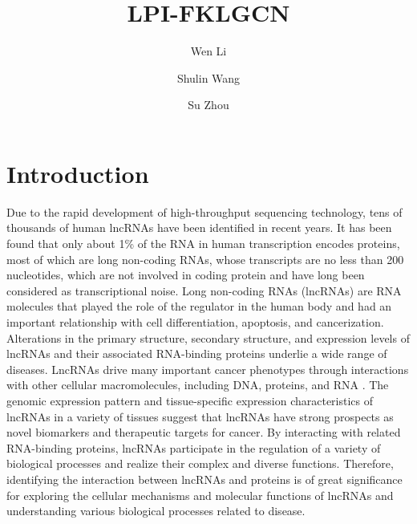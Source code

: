 \documentclass[fleqn,10pt]{wlscirep}
\title{LPI-FKLGCN}
\author[1]{Wen Li}
\author[1,*]{Shulin Wang}
\author[1]{Su Zhou}
\affil[1]{Hunan University, College of Computer Science and Electronic Engineering,Hunan, Changsha, 410082, China}
\affil[*]{corresponding.smartforesting@163.com}
\begin{document}
\flushbottom
\maketitle
%
%
\thispagestyle{empty}

\section*{Introduction}
Due to the rapid development of high-throughput sequencing technology, tens of thousands of human lncRNAs have been identified in recent years\cite{Chen2013}. It has been found that only about 1\% of the RNA in human transcription encodes proteins, most of which are long non-coding RNAs, whose transcripts are no less than 200 nucleotides, which are not involved in coding protein and have long been considered as transcriptional noise\cite{Engreitz2016}. Long non-coding RNAs (lncRNAs) are RNA molecules that played the role of the regulator in the human body and had an important relationship with cell differentiation, apoptosis, and cancerization\cite{Harrow2012}. Alterations in the primary structure, secondary structure, and expression levels of lncRNAs and their associated RNA-binding proteins underlie a wide range of diseases\cite{Li2014,Wapinski2011}. LncRNAs drive many important cancer phenotypes through interactions with other cellular macromolecules, including DNA, proteins, and RNA \cite{Schmitt2016}. The genomic expression pattern and tissue-specific expression characteristics of lncRNAs in a variety of tissues suggest that lncRNAs have strong prospects as novel biomarkers and therapeutic targets for cancer\cite{Chen2017}. By interacting with related RNA-binding proteins, lncRNAs participate in the regulation of a variety of biological processes and realize their complex and diverse functions\cite{Djebali2012}. Therefore, identifying the interaction between lncRNAs and proteins is of great significance for exploring the cellular mechanisms and molecular functions of lncRNAs and understanding various biological processes related to disease.
\end{document}
